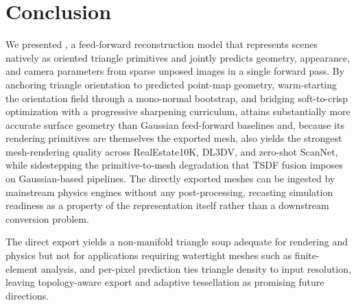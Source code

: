 \section{Conclusion}
\label{sec:conclusion}

We presented \method, a feed-forward reconstruction model that represents scenes natively as oriented triangle primitives and jointly predicts geometry, appearance, and camera parameters from sparse unposed images in a single forward pass. By anchoring triangle orientation to predicted point-map geometry, warm-starting the orientation field through a mono-normal bootstrap, and bridging soft-to-crisp optimization with a progressive sharpening curriculum, \method attains substantially more accurate surface geometry than Gaussian feed-forward baselines and, because its rendering primitives are themselves the exported mesh, also yields the strongest mesh-rendering quality across RealEstate10K, DL3DV, and zero-shot ScanNet, while sidestepping the primitive-to-mesh degradation that TSDF fusion imposes on Gaussian-based pipelines. The directly exported meshes can be ingested by mainstream physics engines without any post-processing, recasting simulation readiness as a property of the representation itself rather than a downstream conversion problem.

The direct export yields a non-manifold triangle soup adequate for rendering and physics but not for applications requiring watertight meshes such as finite-element analysis, and per-pixel prediction ties triangle density to input resolution, leaving topology-aware export and adaptive tessellation as promising future directions.
